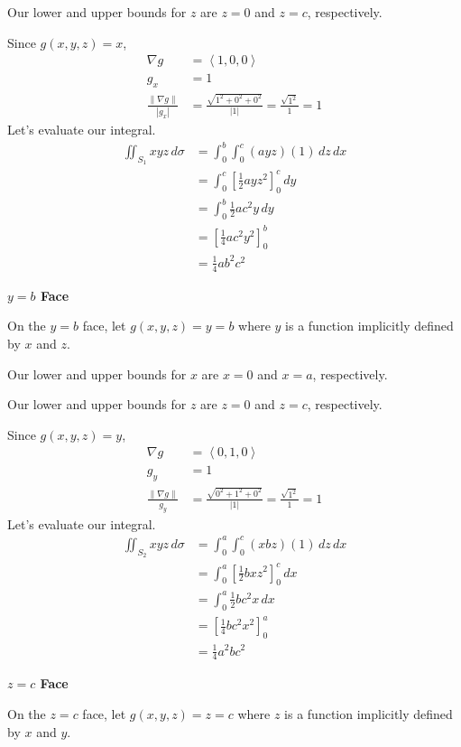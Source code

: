 \documentclass{article}
\newcommand{\lrp}[1]{\left( #1 \right)}
\newcommand{\lra}[1]{\left\langle #1 \right\rangle}
\newcommand{\lrb}[1]{\left[ #1 \right]}
\newcommand{\norm}[1]{\left\lVert #1 \right\rVert}
\begin{document}
Our lower and upper bounds for $z$ are $z=0$ and $z=c$, respectively.

Since $g(x,y,z)=x$,
\begin{align*}
    \nabla g&=\lra{1,0,0}\\
    g_x&=1\\
    \frac{\norm{\nabla g}}{\left|g_x\right|}&=\frac{\sqrt{1^2+0^2+0^2}}{\left|1\right|}=\frac{\sqrt{1^2}}{1}=1
\end{align*}
Let's evaluate our integral.
\begin{align*}
   \iint_{S_1}xyz\,d\sigma &=\int_0^b\int_0^c \lrp{ayz}\lrp{1}\,dz\,dx\\
    &=\int_0^c \lrb{\frac{1}{2}ayz^2}_0^c\,dy\\
    &=\int_0^b \frac{1}{2}ac^2y\,dy\\
    &=\lrb{\frac{1}{4}ac^2y^2}_0^b\\
    &=\frac{1}{4}ab^2c^2
\end{align*}

{}\textbf{$y=b$ Face}

On the $y=b$ face, let $g(x,y,z)=y=b$ where $y$ is a function implicitly defined by $x$ and $z$. 

Our lower and upper bounds for $x$ are $x=0$ and $x=a$, respectively.

Our lower and upper bounds for $z$ are $z=0$ and $z=c$, respectively.

Since $g(x,y,z)=y$,
\begin{align*}
    \nabla g &=\lra{0,1,0}\\
    g_y&=1\\
    \frac{\norm{\nabla g}}{g_y}&=\frac{\sqrt{0^2+1^2+0^2}}{\left|1\right|}=\frac{\sqrt{1^2}}{1}=1
\end{align*}
Let's evaluate our integral.
\begin{align*}
  \iint_{S_2}xyz\,d\sigma   &=\int_0^a\int_0^c \lrp{xbz}\lrp{1}\,dz\,dx\\
    &=\int_0^a \lrb{\frac{1}{2}bxz^2}_0^c\,dx\\
    &=\int_0^a \frac{1}{2}bc^2 x\,dx\\
    &=\lrb{\frac{1}{4}bc^2x^2}_0^a\\
    &=\frac{1}{4}a^2bc^2
\end{align*}

{}\textbf{$z=c$ Face}

On the $z=c$ face, let $g(x,y,z)=z=c$ where $z$ is a function implicitly defined by $x$ and $y$.
\end{document}
